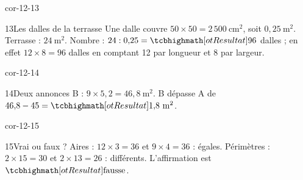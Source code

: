 \begin{blocLivre}{cor-12-13}\begin{corrige}{13}{Les dalles de la terrasse}
Une dalle couvre $50\times50=2\,500\ \mathrm{cm}^2$, soit $0{,}25\ \mathrm m^2$. Terrasse : $24\ \mathrm m^2$. Nombre : $24:0{,}25=\res{96}$ dalles ; en effet $12\times8=96$ dalles en comptant 12 par longueur et 8 par largeur.
\end{corrige}\end{blocLivre}
\begin{blocLivre}{cor-12-14}\begin{corrige}{14}{Deux annonces}
B : $9\times5{,}2=46{,}8\ \mathrm m^2$. B dépasse A de $46{,}8-45=\res{1{,}8\ \mathrm m^2}$.
\end{corrige}\end{blocLivre}
\begin{blocLivre}{cor-12-15}\begin{corrige}{15}{Vrai ou faux ?}
Aires : $12\times3=36$ et $9\times4=36$ : égales. Périmètres : $2\times15=30$ et $2\times13=26$ : différents. L’affirmation est $\res{\text{fausse}}$.
\end{corrige}\end{blocLivre}
